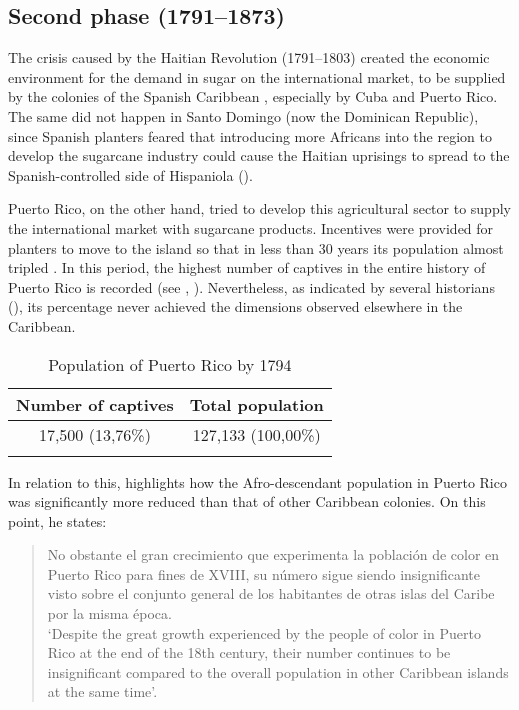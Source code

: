\documentclass[output=paper,colorlinks,citecolor=brown]{langscibook}
\begin{document}
\subsection{Second phase (1791--1873)}

The crisis caused by the Haitian Revolution (1791--1803) created the economic environment for the demand in sugar on the international market, to be supplied by the colonies of the Spanish Caribbean \citep{Villagómez2005}, especially by Cuba and Puerto Rico. The same did not happen in Santo Domingo (now the Dominican Republic), since Spanish planters feared that introducing more Africans into the region to develop the sugarcane industry could cause the Haitian uprisings to spread to the Spanish-controlled side of Hispaniola (\citealt{Ott1973,gibson_peterhouse2010}).

Puerto Rico, on the other hand, tried to develop this agricultural sector to supply the international market with sugarcane products. Incentives were provided for planters to move to the island so that in less than 30 years its population almost tripled \citep{Dietz2018}. In this period, the highest number of captives in the entire history of Puerto Rico is recorded (see , \citealt[76]{AlvarezNazario1974}). Nevertheless, as indicated by several historians (\citealt{morales1978,Martínez-Fernández1993,Stark2009}), its percentage never achieved the dimensions observed elsewhere in the Caribbean.
 
\begin{table}
\begin{tabular}{cc}
\lsptoprule
 {Number of captives} & {Total population}\\\midrule
 17,500 (13,76\%) & 127,133 (100,00\%)\\
\lspbottomrule
\end{tabular}
\caption{Population of Puerto Rico by 1794\label{tab:visconti:7}}
\end{table}

In relation to this, \citet[74]{Blanco1948} highlights how the Afro-descendant population in Puerto Rico was significantly more reduced than that of other Caribbean colonies. On this point, he states:
\begin{quote}
No obstante el gran crecimiento que experimenta la población de color en Puerto Rico para fines de XVIII, su número sigue siendo insignificante visto sobre el conjunto general de los habitantes de otras islas del Caribe por la misma época.\\
`Despite the great growth experienced by the people of color in Puerto Rico at the end of the 18th century, their number continues to be insignificant   compared to the overall population in other Caribbean islands at the same time'. 
\end {quote}
\end{document}
